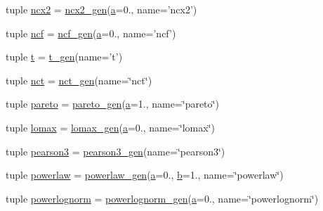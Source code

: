 \begin{DoxyCompactItemize}
tuple \hyperlink{namespacescipy_1_1stats_1_1__continuous__distns_aac72115191c9c44473a87ed108ea4ee9}{ncx2} = \hyperlink{classscipy_1_1stats_1_1__continuous__distns_1_1ncx2__gen}{ncx2\+\_\+gen}(\hyperlink{gen__mat5files_8m_aae328bf20413f220e38aec4d95bfd6da}{a}=0., name='ncx2')
\item 
tuple \hyperlink{namespacescipy_1_1stats_1_1__continuous__distns_af685a3cd05a6b7b0ff6d24d97f89bca6}{ncf} = \hyperlink{classscipy_1_1stats_1_1__continuous__distns_1_1ncf__gen}{ncf\+\_\+gen}(\hyperlink{gen__mat5files_8m_aae328bf20413f220e38aec4d95bfd6da}{a}=0., name='ncf')
\item 
tuple \hyperlink{namespacescipy_1_1stats_1_1__continuous__distns_a18a741b517a4ea05b2506252c68495c5}{t} = \hyperlink{classscipy_1_1stats_1_1__continuous__distns_1_1t__gen}{t\+\_\+gen}(name='t')
\item 
tuple \hyperlink{namespacescipy_1_1stats_1_1__continuous__distns_ad4bd965f05614335ce2cb7533994446d}{nct} = \hyperlink{classscipy_1_1stats_1_1__continuous__distns_1_1nct__gen}{nct\+\_\+gen}(name=\char`\"{}nct\char`\"{})
\item 
tuple \hyperlink{namespacescipy_1_1stats_1_1__continuous__distns_a6da09f2167f6857fefed25406ece0fdf}{pareto} = \hyperlink{classscipy_1_1stats_1_1__continuous__distns_1_1pareto__gen}{pareto\+\_\+gen}(\hyperlink{gen__mat5files_8m_aae328bf20413f220e38aec4d95bfd6da}{a}=1., name=\char`\"{}pareto\char`\"{})
\item 
tuple \hyperlink{namespacescipy_1_1stats_1_1__continuous__distns_a6bd25fe6b41e4672c5082861a96a4ac7}{lomax} = \hyperlink{classscipy_1_1stats_1_1__continuous__distns_1_1lomax__gen}{lomax\+\_\+gen}(\hyperlink{gen__mat5files_8m_aae328bf20413f220e38aec4d95bfd6da}{a}=0., name=\char`\"{}lomax\char`\"{})
\item 
tuple \hyperlink{namespacescipy_1_1stats_1_1__continuous__distns_afe1d762b0da97a8ac3c6d64e4a2f9c89}{pearson3} = \hyperlink{classscipy_1_1stats_1_1__continuous__distns_1_1pearson3__gen}{pearson3\+\_\+gen}(name=\char`\"{}pearson3\char`\"{})
\item 
tuple \hyperlink{namespacescipy_1_1stats_1_1__continuous__distns_a8a9111ff86f8fa8b7407d4ceb9e836a2}{powerlaw} = \hyperlink{classscipy_1_1stats_1_1__continuous__distns_1_1powerlaw__gen}{powerlaw\+\_\+gen}(\hyperlink{gen__mat5files_8m_aae328bf20413f220e38aec4d95bfd6da}{a}=0., \hyperlink{gen__mat5files_8m_a7b38767b3b6a8dae167e5afa4fc340b0}{b}=1., name=\char`\"{}powerlaw\char`\"{})
\item 
tuple \hyperlink{namespacescipy_1_1stats_1_1__continuous__distns_a799a7cc92f1665b469d15e0a34dc30c0}{powerlognorm} = \hyperlink{classscipy_1_1stats_1_1__continuous__distns_1_1powerlognorm__gen}{powerlognorm\+\_\+gen}(\hyperlink{gen__mat5files_8m_aae328bf20413f220e38aec4d95bfd6da}{a}=0., name=\char`\"{}powerlognorm\char`\"{})

\end{DoxyCompactItemize}
